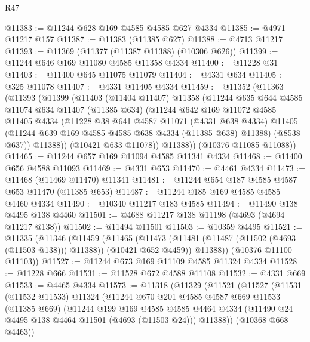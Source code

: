 \begin{lexlean}{R47}
\begin{coremodule}
@11383 := @11244 @628 @169 @4585 @4585 @627 @4334
@11385 := @4971 @11217 @157
@11387 := @11383 (@11385 @627)
@11388 := @4713 @11217
@11393 := @11369 (@11377 (@11387 @11388) (@10306 @626))
@11399 := @11244 @646 @169 @11080 @4585 @11358 @4334
@11400 := @11228 @31
@11403 := @11400 @645 @11075 @11079
@11404 := @4331 @634
@11405 := @325 @11078
@11407 := @4331 @11405 @4334
@11459 := @11352
    (@11363
      (@11393
        (@11399
          (@11403
            (@11404 @11407)
            @11358
            (@11244
              @635
              @644
              @4585
              @11074
              @634
              @11407
              (@11385 @634)
              (@11244
                @642
                @169
                @11072
                @4585
                @11405
                @4334
                (@11228
                  @38
                  @641
                  @4587
                  @11071
                  (@4331 @638 @4334)
                  @11405
                  (@11244 @639 @169 @4585 @4585 @638 @4334 (@11385 @638) @11388)
                  (@8538 @637))
                @11388))
            (@10421 @633 @11078))
          @11388))
      (@10376 @11085 @11088))
@11465 := @11244 @657 @169 @11094 @4585 @11341 @4334
@11468 := @11400 @656 @4588 @11093
@11469 := @4331 @653
@11470 := @4461 @4334
@11473 := @11468 (@11469 @11470) @11341
@11481 := @11244 @654 @187 @4585 @4587 @653 @11470 (@11385 @653)
@11487 := @11244 @185 @169 @4585 @4585 @4460 @4334
@11490 := @10340 @11217 @183 @4585
@11494 := @11490 @138 @4495 @138 @4460
@11501 := @4688 @11217 @138 @11198 (@4693 (@4694 @11217 @138))
@11502 := @11494 @11501
@11503 := @10359 @4495
@11521 := @11335
    (@11346
      (@11459
        (@11465
          (@11473 (@11481 (@11487 (@11502 (@4693 (@11503 @138))) @11388)) (@10421 @652 @4459))
          @11388))
      (@10376 @11100 @11103))
@11527 := @11244 @673 @169 @11109 @4585 @11324 @4334
@11528 := @11228 @666
@11531 := @11528 @672 @4588 @11108
@11532 := @4331 @669
@11533 := @4465 @4334
@11573 := @11318
    (@11329
      (@11521
        (@11527
          (@11531
            (@11532 @11533)
            @11324
            (@11244
              @670
              @201
              @4585
              @4587
              @669
              @11533
              (@11385 @669)
              (@11244
                @199
                @169
                @4585
                @4585
                @4464
                @4334
                (@11490 @24 @4495 @138 @4464 @11501 (@4693 (@11503 @24)))
                @11388))
            (@10368 @668 @4463))

\end{coremodule}
\end{lexlean}
